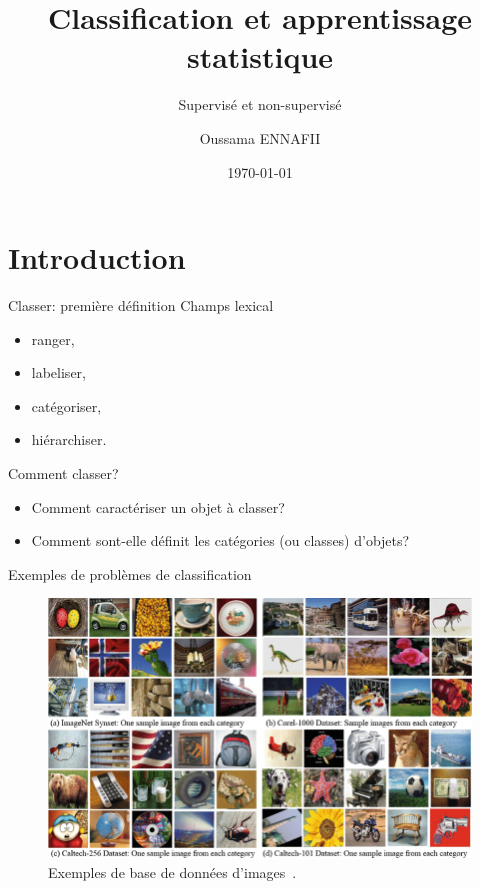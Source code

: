 \documentclass[8pt]{beamer}
\title{Classification et apprentissage statistique}
\subtitle{Supervisé et non-supervisé}
\author{Oussama ENNAFII}
\institute{ENSG}
\date{\today}
\begin{document}
	\begin{frame}[plain]
		\titlepage{}
	\end{frame}

	\section{Introduction}

		\begin{frame}{Classer: première définition}
			Champs lexical
			\begin{itemize}
				\item<2-> ranger,
				\item<3-> labeliser,
				\item<4-> catégoriser,
				\item<5-> hiérarchiser.
			\end{itemize}
		\end{frame}
		
		\begin{frame}{Comment classer?}
			\begin{itemize}
					\item<1-> Comment caractériser un objet à classer?
					\item<2-> Comment sont-elle définit les catégories (ou classes) d'objets?
			\end{itemize}
		\end{frame}

		\begin{frame}{Exemples de problèmes de classification}
			\begin{figure}[H]
				\includegraphics[width=.7\textwidth]{images/samples/image_datasets}
				\caption*{\tiny Exemples de base de données d'images~\cite{ahmed2017fusion}.}
			\end{figure}
		\end{frame}
		
\end{document}
